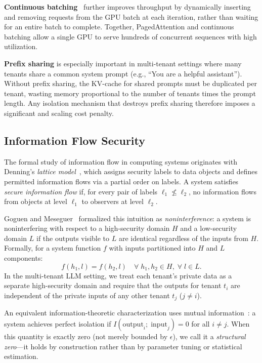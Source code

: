 \documentclass[11pt]{article}
\begin{document}
\textbf{Continuous batching}~\citep{yu2022orca} further improves
throughput by dynamically inserting and removing requests from the GPU
batch at each iteration, rather than waiting for an entire batch to
complete.  Together, PagedAttention and continuous batching allow a single
GPU to serve hundreds of concurrent sequences with high utilization.

\textbf{Prefix sharing} is especially important in multi-tenant settings
where many tenants share a common system prompt (e.g., ``You are a helpful
assistant'').  Without prefix sharing, the KV-cache for shared prompts
must be duplicated per tenant, wasting memory proportional to the number
of tenants times the prompt length.  Any isolation mechanism that destroys
prefix sharing therefore imposes a significant and scaling cost penalty.

\subsection{Information Flow Security}
\label{sec:bg_infoflow}

The formal study of information flow in computing systems originates with
Denning's \emph{lattice model}~\citep{denning1976lattice}, which assigns
security labels to data objects and defines permitted information flows via
a partial order on labels.  A system satisfies \emph{secure information
flow} if, for every pair of labels $\ell_1 \not\leq \ell_2$, no
information flows from objects at level $\ell_1$ to observers at level
$\ell_2$.

Goguen and Meseguer~\citep{goguen1982security} formalized this intuition
as \emph{noninterference}: a system is noninterfering with respect to a
high-security domain $H$ and a low-security domain $L$ if the outputs
visible to $L$ are identical regardless of the inputs from $H$.  Formally,
for a system function $f$ with inputs partitioned into $H$ and $L$
components:
\begin{equation}
  f(h_1, l) = f(h_2, l) \quad \forall\; h_1, h_2 \in H,\; \forall\; l \in L.
  \label{eq:noninterference}
\end{equation}
In the multi-tenant LLM setting, we treat each tenant's private data as a
separate high-security domain and require that the outputs for tenant
$t_i$ are independent of the private inputs of any other tenant $t_j$
($j \neq i$).

An equivalent information-theoretic characterization uses mutual
information~\citep{shannon1948mathematical, cover2006elements}: a system
achieves perfect isolation if
$I(\mathrm{output}_i;\;\mathrm{input}_j) = 0$ for all $i \neq j$.  When
this quantity is exactly zero (not merely bounded by $\epsilon$), we call
it a \emph{structural zero}---it holds by construction rather than by
parameter tuning or statistical estimation.
\end{document}
